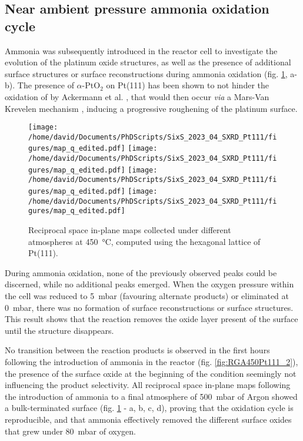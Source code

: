 \subsection{Near ambient pressure ammonia oxidation cycle}

Ammonia was subsequently introduced in the reactor cell to investigate the evolution of the platinum oxide structures, as well as the presence of additional surface structures or surface reconstructions during ammonia oxidation (fig. \ref{fig:MapsPt111B}, a-b).
The presence of $\alpha$-PtO$_2$ on Pt(111) has been shown to not hinder the oxidation of  by Ackermann et al. \parencite*{Ackermann2007}, that would then occur \textit{via} a Mars-Van Krevelen mechanism \parencite{Mars1954}, inducing a progressive roughening of the platinum surface.

\begin{figure}[!htb]
    \centering
    \texttt{[image: /home/david/Documents/PhDScripts/SixS\_2023\_04\_SXRD\_Pt111/figures/map\_q\_edited.pdf]}
    \texttt{[image: /home/david/Documents/PhDScripts/SixS\_2023\_04\_SXRD\_Pt111/figures/map\_q\_edited.pdf]}
    \texttt{[image: /home/david/Documents/PhDScripts/SixS\_2023\_04\_SXRD\_Pt111/figures/map\_q\_edited.pdf]}
    \texttt{[image: /home/david/Documents/PhDScripts/SixS\_2023\_04\_SXRD\_Pt111/figures/map\_q\_edited.pdf]}
    \caption{
        Reciprocal space in-plane maps collected under different atmospheres at \qty{450}{\degreeCelsius}, computed using the hexagonal lattice of Pt(111).
    }
    \label{fig:MapsPt111B}
\end{figure}

During ammonia oxidation, none of the previously observed peaks could be discerned, while no additional peaks emerged.
When the oxygen pressure within the cell was reduced to \qty{5}{\milli\bar} (favouring alternate products) or eliminated at \qty{0}{\milli\bar}, there was no formation of surface reconstructions or surface structures.
This result shows that the reaction removes the oxide layer present of the surface until the structure disappears.

No transition between the reaction products is observed in the first hours following the introduction of ammonia in the reactor (fig. \ref{fig:RGA450Pt111_2}), the presence of the surface oxide at the beginning of the condition seemingly not influencing the product selectivity.
All reciprocal space in-plane maps following the introduction of ammonia to a final atmosphere of \qty{500}{\milli\bar} of Argon showed a bulk-terminated surface (fig. \ref{fig:MapsPt111B} - a, b, c, d), proving that the oxidation cycle is reproducible, and that ammonia effectively removed the different surface oxides that grew under \qty{80}{\milli\bar} of oxygen.

